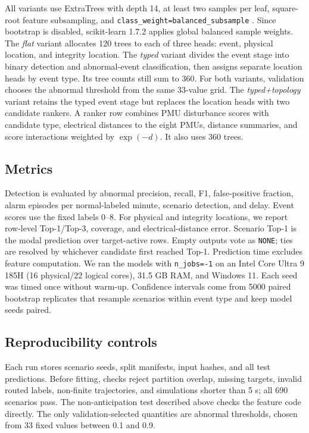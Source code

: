 \documentclass[conference]{IEEEtran}
\begin{document}
All variants use ExtraTrees with depth 14, at least two samples per leaf, square-root feature subsampling, and \texttt{class\_weight=balanced\_subsample} \cite{geurts2006,pedregosa2011}. Since bootstrap is disabled, scikit-learn 1.7.2 applies global balanced sample weights. The \emph{flat} variant allocates 120 trees to each of three heads: event, physical location, and integrity location. The \emph{typed} variant divides the event stage into binary detection and abnormal-event classification, then assigns separate location heads by event type. Its tree counts still sum to 360. For both variants, validation chooses the abnormal threshold from the same 33-value grid. The \emph{typed+topology} variant retains the typed event stage but replaces the location heads with two candidate rankers. A ranker row combines PMU disturbance scores with candidate type, electrical distances to the eight PMUs, distance summaries, and score interactions weighted by $\exp(-d)$. It also uses 360 trees.

\subsection{Metrics}
Detection is evaluated by abnormal precision, recall, F1, false-positive fraction, alarm episodes per normal-labeled minute, scenario detection, and delay. Event scores use the fixed labels 0--8. For physical and integrity locations, we report row-level Top-1/Top-3, coverage, and electrical-distance error. Scenario Top-1 is the modal prediction over target-active rows. Empty outputs vote as \texttt{NONE}; ties are resolved by whichever candidate first reached Top-1. Prediction time excludes feature computation. We ran the models with \texttt{n\_jobs=-1} on an Intel Core Ultra 9 185H (16 physical/22 logical cores), 31.5 GB RAM, and Windows 11. Each seed was timed once without warm-up. Confidence intervals come from 5000 paired bootstrap replicates that resample scenarios within event type and keep model seeds paired.

\subsection{Reproducibility controls}
Each run stores scenario seeds, split manifests, input hashes, and all test predictions. Before fitting, checks reject partition overlap, missing targets, invalid routed labels, non-finite trajectories, and simulations shorter than 5 s; all 690 scenarios pass. The non-anticipation test described above checks the feature code directly. The only validation-selected quantities are abnormal thresholds, chosen from 33 fixed values between 0.1 and 0.9.
\end{document}
